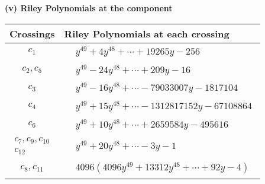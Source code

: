 \documentclass[1p]{elsarticle_modified}
\theoremstyle{definition}
\begin{document}
\newpage\renewcommand{\arraystretch}{1}
\flushleft \textbf{(v) Riley Polynomials at the component}\newline \\
\begin{tabular}{m{50pt}|m{274pt}}
Crossings & \hspace{64pt}Riley Polynomials at each crossing \\
\hline $$\begin{aligned}c_{1}\end{aligned}$$&$\begin{aligned}
&y^{49}+4 y^{48}+\cdots+19265 y-256
\end{aligned}$\\
\hline $$\begin{aligned}c_{2},c_{5}\end{aligned}$$&$\begin{aligned}
&y^{49}-24 y^{48}+\cdots+209 y-16
\end{aligned}$\\
\hline $$\begin{aligned}c_{3}\end{aligned}$$&$\begin{aligned}
&y^{49}-16 y^{48}+\cdots-79033007 y-1817104
\end{aligned}$\\
\hline $$\begin{aligned}c_{4}\end{aligned}$$&$\begin{aligned}
&y^{49}+15 y^{48}+\cdots-1312817152 y-67108864
\end{aligned}$\\
\hline $$\begin{aligned}c_{6}\end{aligned}$$&$\begin{aligned}
&y^{49}+10 y^{48}+\cdots+2659584 y-495616
\end{aligned}$\\
\hline $$\begin{aligned}c_{7},c_{9},c_{10}\\c_{12}\end{aligned}$$&$\begin{aligned}
&y^{49}+20 y^{48}+\cdots-3 y-1
\end{aligned}$\\
\hline $$\begin{aligned}c_{8},c_{11}\end{aligned}$$&$\begin{aligned}
&4096(4096 y^{49}+13312 y^{48}+\cdots+92 y-4)
\end{aligned}$\\
\hline
\end{tabular}\\~\\
\end{document}
